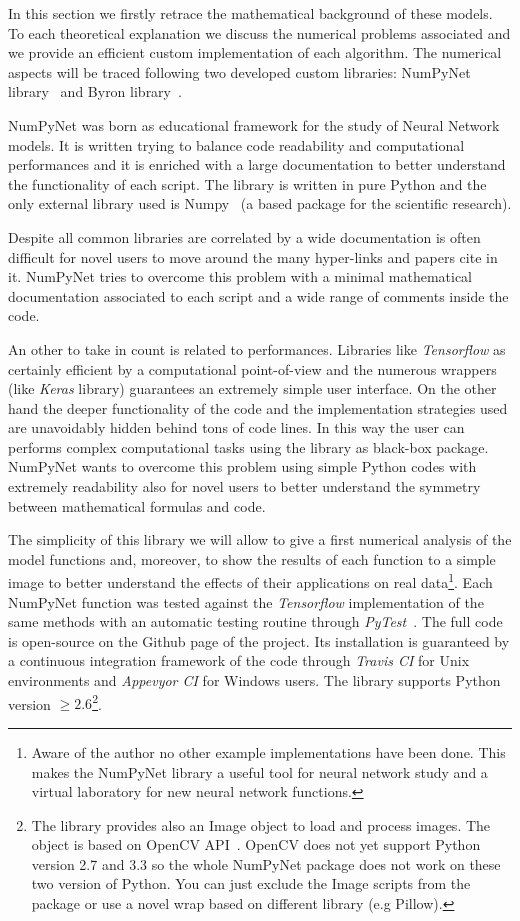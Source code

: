 \documentclass{standalone}
\begin{document}
In this section we firstly retrace the mathematical background of these models.
To each theoretical explanation we discuss the numerical problems associated and we provide an efficient custom implementation of each algorithm.
The numerical aspects will be traced following two  developed custom libraries: NumPyNet library~\cite{NumPyNet} and Byron library~\cite{Byron}.

NumPyNet was born as educational framework for the study of Neural Network models.
It is written trying to balance code readability and computational performances and it is enriched with a large documentation to better understand the functionality of each script.
The library is written in pure Python and the only external library used is Numpy~\cite{Numpy} (a based package for the scientific research).

Despite all common libraries are correlated by a wide documentation is often difficult for novel users to move around the many hyper-links and papers cite in it.
NumPyNet tries to overcome this problem with a minimal mathematical documentation associated to each script and a wide range of comments inside the code.

An other  to take in count is related to performances.
Libraries like \emph{Tensorflow} as certainly efficient by a computational point-of-view and the numerous wrappers (like \emph{Keras} library) guarantees an extremely simple user interface.
On the other hand the deeper functionality of the code and the implementation strategies used are unavoidably hidden behind tons of code lines.
In this way the user can performs complex computational tasks using the library as black-box package.
NumPyNet wants to overcome this problem using simple Python codes with extremely readability also for novel users to better understand the symmetry between mathematical formulas and code.

The simplicity of this library we will allow to give a first numerical analysis of the model functions and, moreover, to show the results of each function to a simple image to better understand the effects of their applications on real data\footnote{
  Aware of the author no other example implementations have been done.
  This makes the NumPyNet library a useful tool for neural network study and a virtual laboratory for new neural network functions.
}.
Each NumPyNet function was tested against the \emph{Tensorflow} implementation of the same methods with an automatic testing routine through \emph{PyTest}~\cite{Okken:2017:PTP:3176124}.
The full code is open-source on the Github page of the project.
Its installation is guaranteed by a continuous integration framework of the code through \emph{Travis CI} for Unix environments and \emph{Appevyor CI} for Windows users.
The library supports Python version $\ge2.6$\footnote{
  The library provides also an \textsf{Image} object to load and process images.
  The object is based on OpenCV API~\cite{OpenCV}.
  OpenCV does not yet support Python version 2.7 and 3.3 so the whole NumPyNet package does not work on these two version of Python.
  You can just exclude the \textsf{Image} scripts from the package or use a novel wrap based on different library (e.g \textsf{Pillow}).
}.
\end{document}
